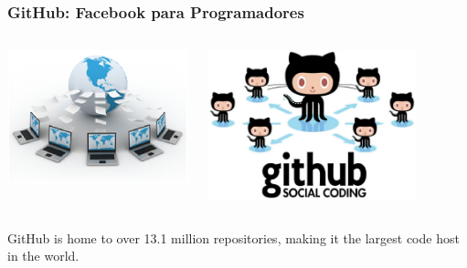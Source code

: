 \documentclass{beamer}
\begin{document}
\begin{frame}
\frametitle{GitHub: Facebook para Programadores}
\begin{columns}
  \begin{column}{0.5\textwidth}
  \includegraphics[width=1.0\textwidth]{img/worldcollaboration.eps}
  \end{column}
  \begin{column}{0.5\textwidth}
  \begin{center}
  \includegraphics[width=0.8\textwidth]{img/github.eps}
  \end{center}
  \end{column}
\end{columns}

GitHub is home to {\color{red} over 13.1 million repositories}, making it the largest code host in the world.
\end{frame}
\end{document}

